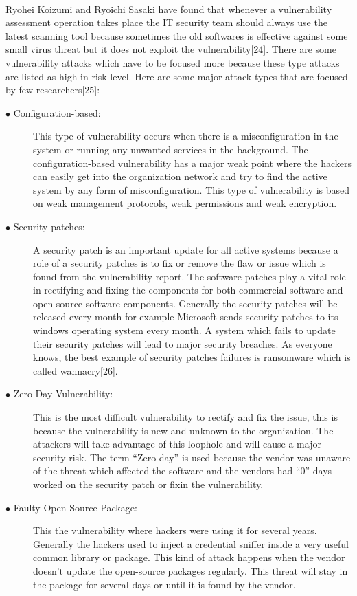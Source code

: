 \paragraph{}
Ryohei Koizumi and Ryoichi Sasaki have found that whenever a vulnerability assessment operation takes place the IT security team should always use the latest scanning tool because sometimes the old softwares is effective against some small virus threat but it does not exploit the vulnerability[24]. There are some vulnerability attacks which have to be focused more because these type attacks are listed as high in risk level. Here are some major attack types that are focused by few researchers[25]:
\begin{description}
	\item [$\bullet$ Configuration-based:] This type of vulnerability occurs when there is a misconfiguration in the system or running any unwanted services in the background. The configuration-based vulnerability has a major weak point where the hackers can easily get into the organization network and try to find the active system by any form of misconfiguration. This type of vulnerability is based on weak management protocols, weak permissions and weak encryption.
	
	\item [$\bullet$ Security patches:] A security patch is an important update for all active systems because a role of a security patches is to fix or remove the flaw or issue which is found from the vulnerability report. The software patches play a vital role in rectifying and fixing the components for both commercial software and open-source software components. Generally the security patches will be released every month for example Microsoft sends security patches to its windows operating system every month. A system which fails to update their security patches will lead to major security breaches. As everyone knows, the best example of security patches failures is ransomware which is called wannacry[26].
	
	\item [$\bullet$ Zero-Day Vulnerability:] This is the most difficult vulnerability to rectify and fix the issue, this is because the vulnerability is new and unknown to the organization. The attackers will take advantage of this loophole and will cause a major security risk. The term “Zero-day” is used because the vendor was unaware of the threat which affected the software and the vendors had “0” days worked on the security patch or fixin the vulnerability.
	
	\item [$\bullet$ Faulty Open-Source Package:] This the vulnerability where hackers were using it for several years. Generally the hackers used to inject a credential sniffer inside a very useful common library or package. This kind of attack happens when the vendor doesn’t update the open-source packages regularly. This threat will stay in the package for several days or until it is found by the vendor.
\end{description}

